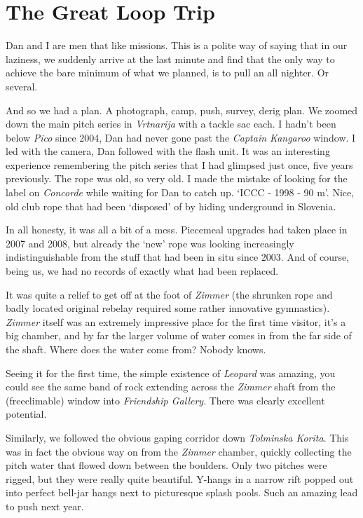 \section{The Great Loop Trip}

Dan and I are men that like missions. This is a polite way of saying
that in our laziness, we suddenly arrive at the last minute and find
that the only way to achieve the bare minimum of what we planned, is to
pull an all nighter. Or several.

And so we had a plan. A photograph, camp, push, survey, derig plan. We
zoomed down the main pitch series in \emph{Vrtnarija} with a tackle sac
each. I hadn't been below \emph{Pico} since 2004, Dan had never gone
past the \emph{Captain Kangaroo} window. I led with the camera, Dan
followed with the flash unit. It was an interesting experience
remembering the pitch series that I had glimpsed just once, five years
previously. The rope was old, so very old. I made the mistake of looking
for the label on \emph{Concorde} while waiting for Dan to catch up.
`ICCC - 1998 - 90 m'. Nice, old club rope that had been `disposed' of by
hiding underground in Slovenia.

In all honesty, it was all a bit of a mess. Piecemeal upgrades had taken
place in 2007 and 2008, but already the `new' rope was looking
increasingly indistinguishable from the stuff that had been in situ
since 2003. And of course, being us, we had no records of exactly what
had been replaced.

It was quite a relief to get off at the foot of \emph{Zimmer} (the
shrunken rope and badly located original rebelay required some rather
innovative gymnastics). \emph{Zimmer} itself was an extremely impressive
place for the first time visitor, it's a big chamber, and by far the
larger volume of water comes in from the far side of the shaft. Where
does the water come from? Nobody knows.

Seeing it for the first time, the simple existence of \emph{Leopard} was
amazing, you could see the same band of rock extending across the
\emph{Zimmer} shaft from the (freeclimable) window into \emph{Friendship
Gallery}. There was clearly excellent potential.

Similarly, we followed the obvious gaping corridor down \emph{Tolminska
Korita}. This was in fact the obvious way on from the \emph{Zimmer}
chamber, quickly collecting the pitch water that flowed down between the
boulders. Only two pitches were rigged, but they were really quite
beautiful. Y-hangs in a narrow rift popped out into perfect bell-jar
hangs next to picturesque splash pools. Such an amazing lead to push
next year.

